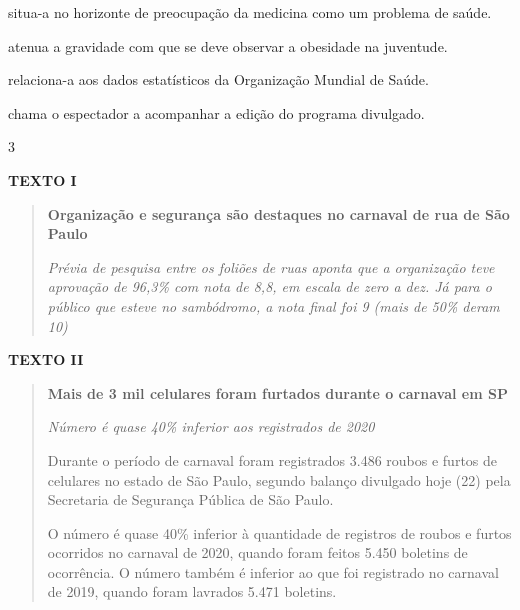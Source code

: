 \begin{escolha}
\item situa-a no horizonte de preocupação da medicina como um problema de
saúde.

\item atenua a gravidade com que se deve observar a obesidade na juventude.

\item relaciona-a aos dados estatísticos da Organização Mundial de Saúde.

\item chama o espectador a acompanhar a edição do programa divulgado.
\end{escolha}

\num{3}

\textbf{TEXTO I}

\begin{quote}
\textbf{Organização e segurança são destaques no carnaval de rua de São
Paulo}

\emph{Prévia de pesquisa entre os foliões de ruas aponta que a
organização teve aprovação de 96,3\% com nota de 8,8, em escala de zero
a dez. Já para o público que esteve no sambódromo, a nota final foi 9
(mais de 50\% deram 10)}
\end{quote}


\textbf{TEXTO II}

\begin{quote}
\textbf{Mais de 3 mil celulares foram furtados durante o carnaval em SP}

\emph{Número é quase 40\% inferior aos registrados de 2020}

Durante o período de carnaval foram registrados 3.486 roubos e furtos de
celulares no estado de São Paulo, segundo balanço divulgado hoje (22)
pela Secretaria de Segurança Pública de São Paulo.

O número é quase 40\% inferior à quantidade de registros de roubos e
furtos ocorridos no carnaval de 2020, quando foram feitos 5.450 boletins
de ocorrência. O número também é inferior ao que foi registrado no
carnaval de 2019, quando foram lavrados 5.471 boletins.
\end{quote}


